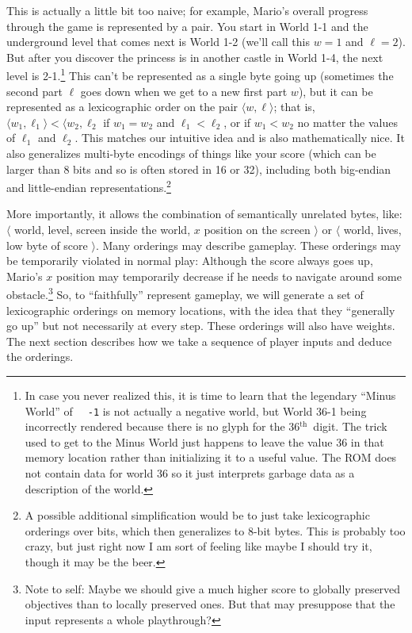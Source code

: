 \documentclass[twocolumn]{article}
\renewcommand\th{$^{\mathrm{th}}$}
\begin{document}
This is actually a little bit too naive; for example, Mario's overall progress through the game is represented by a pair. You start in World 1-1 and the underground level that comes next is World 1-2 (we'll call this $w=1$ and $\ell=2$). But after you discover the princess is in another castle in World 1-4, the next level is 2-1.\footnote{In case you never realized this, it is time to learn that the legendary ``Minus World'' of {\tt\, -1} is not actually a negative world, but World 36-1 being incorrectly rendered because there is no glyph for the 36\th\ digit. The trick used to get to the Minus World just happens to leave the value 36 in that memory location rather than initializing it to a useful value. The ROM does not contain data for world 36 so it just interprets garbage data as a description of the world.} This can't be represented as a single byte going up (sometimes the second part $\ell$ goes down when we get to a new first part $w$), but it can be represented as a lexicographic order on the pair $\langle w, \ell \rangle$; that is, $\langle w_1, \ell_1 \rangle < \langle w_2, \ell_2$ if $w_1 = w_2$ and $\ell_1 < \ell_2$, or if $w_1 < w_2$ no matter the values of $\ell_1$ and $\ell_2$. This matches our intuitive idea and is also mathematically nice. It also generalizes multi-byte encodings of things like your score (which can be larger than 8 bits and so is often stored in 16 or 32), including both big-endian and little-endian representations.\footnote{A possible additional simplification would be to just take lexicographic orderings over bits, which then generalizes to 8-bit bytes. This is probably too crazy, but just right now I am sort of feeling like maybe I should try it, though it may be the beer.}

More importantly, it allows the combination of semantically unrelated bytes, like: $\langle$ world, level, screen inside the world, $x$ position on the screen $\rangle$ or $\langle$ world, lives, low byte of score $\rangle$. Many orderings may describe gameplay. These orderings may be temporarily violated in normal play: Although the score always goes up, Mario's $x$ position may temporarily decrease if he needs to navigate around some obstacle.\footnote{Note to self: Maybe we should give a much higher score to globally preserved objectives than to locally preserved ones. But that may presuppose that the input represents a whole playthrough?} So, to ``faithfully'' represent gameplay, we will generate a set of lexicographic orderings on memory locations, with the idea that they ``generally go up'' but not necessarily at every step. These orderings will also have weights. The next section describes how we take a sequence of player inputs and deduce the orderings.
\end{document}
